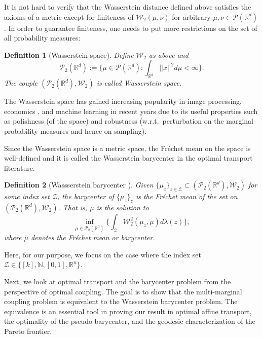 \documentclass[twoside,11pt]{article}
\newtheorem{defi}{Definition}[section]{\bfseries}{\itshape}
\begin{document}
It is not hard to verify that the Wasserstein distance defined above satisfies the axioms of a metric except for finiteness of $\mathcal{W}_2(\mu,\nu)$ for arbitrary $\mu,\nu \in \mathcal{P}(\mathbb{R}^d)$. In order to guarantee finiteness, one needs to put more restrictions on the set of all probability measures:

\begin{defi}[Wasserstein space]
Define $\mathcal{W}_2$ as above and 
\begin{equation}
\mathcal{P}_2(\mathbb{R}^d):= \Big\{\mu \in \mathcal{P}(\mathbb{R}^d): \int_{\mathbb{R}^d} ||x||^2 d\mu < \infty\Big\}.
\end{equation}
The couple $(\mathcal{P}_2(\mathbb{R}^d),\mathcal{W}_2)$ is called Wasserstein space.

\end{defi}

The Wasserstein space has gained increasing popularity in image processing, economics \cite{ekeland2010existence, carlier2010matching}, and machine learning in recent years due to its useful properties such as polishness (of the space) and robustness (w.r.t.\ perturbation on the marginal probability measures and hence on sampling).

Since the Wasserstein space is a metric space, the Fr\'echet mean on the space is well-defined and it is called the Wasserstein barycenter in the optimal transport literature.

\begin{defi}[Wassserstein barycenter \cite{agueh2011barycenters}]\label{d:barycenter definition}
Given $\{\mu_z\}_{z \in \mathcal{Z}} \subset (\mathcal{P}_2(\mathbb{R}^d),\mathcal{W}_2)$ for some index set $\mathcal{Z}$, the barycenter of $\{\mu_z\}_z$ is the Fr\'echet mean of the set on $(\mathcal{P}_2(\mathbb{R}^d),\mathcal{W}_2)$. That is, $\bar{\mu}$ is the solution to
\begin{equation}\label{barycenter}
\inf_{\mu \in \mathcal{P}_2(\mathbb{R}^d)} \Big\{\int_{\mathcal{Z}} \mathcal{W}_2^2(\mu_z,\mu) d\lambda(z)\Big\},
\end{equation}
where $\bar{\mu}$ denotes the Fr\'echet mean or barycenter.
\end{defi}
Here, for our purpose, we focus on the case where the index set $\mathcal{Z} \in \{[k], \mathbb{N}, [0,1], \mathbb{R}^n\}$. 

Next, we look at optimal transport and the barycenter problem from the perspective of optimal coupling. The goal is to show that the multi-marginal coupling problem is equivalent to the Wasserstein barycenter problem. The equivalence is an essential tool in proving our result in optimal affine transport, the optimality of the pseudo-barycenter, and the geodesic characterization of the Pareto frontier.
\end{document}
